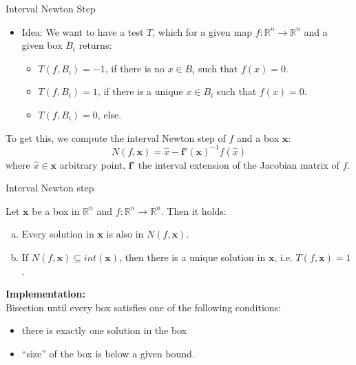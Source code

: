 \documentclass[german,10pt,xcolor=colortbl,compress]{beamer}
\begin{document}
\begin{frame}{Interval Newton Step}
    \begin{itemize}
    \item Idea: We want to have a test $T$, which for a given map $f: \mathbb{R}^n \to
        \mathbb{R}^n$ and a given box $B_i$ returns:
        \begin{itemize}
            \item $T(f,B_i)=-1$, if there is no $x \in B_i$ such that $f(x)=0$.
            \item $T(f,B_i)=1$,  if there is a unique $x \in B_i$ such that $f(x)=0$.
            \item $T(f,B_i)=0$, else.
        \end{itemize}
    \end{itemize}
    \pause
    To get this, we compute the interval Newton step of $f$ and a box $\mathbf{x}$: $$
    N(f, \mathbf{x})= \hat{x} - \mathbf{f'}(\mathbf{x})^{-1}f(\hat{x})$$ where $\hat{x}
    \in \mathbf{x}$ arbitrary point, $\mathbf{f'}$ the interval extension of the Jacobian
    matrix of $f$.
\end{frame}

\begin{frame}{Interval Newton step}
    \begin{theorem}
        Let $\mathbf{x}$ be a box in $\mathbb{R}^n$ and $f:\mathbb{R}^n\to \mathbb{R}^n$.
        Then it holds:
        \begin{enumerate}[a)]
            \item Every solution in $\mathbf{x}$ is also in $N(f,\mathbf{x})$.
            \item If $N(f,\mathbf{x}) \subseteq int(\mathbf{x})$, then there is a unique
                solution in $\mathbf{x}$, i.e. $T(f,\mathbf{x})=1$.
        \end{enumerate}
    \end{theorem}
    \pause

    \textbf{Implementation:} \\
    Bisection until every box satisfies one of the following conditions:
    \begin{itemize}
        \item there is exactly one solution in the box
        \item \enquote{size} of the box is below a given bound.
    \end{itemize}
\end{frame}
\end{document}
